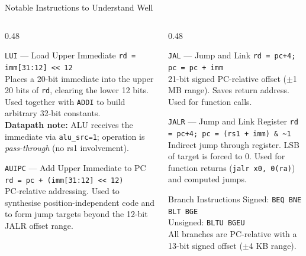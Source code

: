 \documentclass[aspectratio=169,10pt]{beamer}
\begin{document}
\begin{frame}{Notable Instructions to Understand Well}
  \begin{columns}[T]
    \begin{column}{0.48\textwidth}
      \begin{block}{\texttt{LUI} --- Load Upper Immediate}
        \texttt{rd = imm[31:12] << 12}\\[0.3em]
        Places a 20-bit immediate into the upper 20 bits of \texttt{rd}, clearing the lower 12 bits.
        Used together with \texttt{ADDI} to build arbitrary 32-bit constants.\\[0.3em]
        \textbf{Datapath note:} ALU receives the immediate via \texttt{alu\_src=1}; operation is \textit{pass-through} (no rs1 involvement).
      \end{block}
      \vspace{0.5em}
      \begin{block}{\texttt{AUIPC} --- Add Upper Immediate to PC}
        \texttt{rd = pc + (imm[31:12] << 12)}\\[0.3em]
        PC-relative addressing. Used to synthesise position-independent code and to form jump targets beyond the 12-bit JALR offset range.
      \end{block}
    \end{column}
    \begin{column}{0.48\textwidth}
      \begin{block}{\texttt{JAL} --- Jump and Link}
        \texttt{rd = pc+4; pc = pc + imm}\\[0.3em]
        21-bit signed PC-relative offset ($\pm$1 MB range). Saves return address. Used for function calls.
      \end{block}
      \vspace{0.5em}
      \begin{block}{\texttt{JALR} --- Jump and Link Register}
        \texttt{rd = pc+4; pc = (rs1 + imm) \& \textasciitilde1}\\[0.3em]
        Indirect jump through register. LSB of target is forced to 0. Used for function returns (\texttt{jalr x0, 0(ra)}) and computed jumps.
      \end{block}
      \vspace{0.5em}
      \begin{block}{Branch Instructions}
        Signed: \texttt{BEQ BNE BLT BGE}\\
        Unsigned: \texttt{BLTU BGEU}\\[0.3em]
        All branches are PC-relative with a 13-bit signed offset ($\pm$4 KB range).
      \end{block}
    \end{column}
  \end{columns}
\end{frame}
\end{document}
